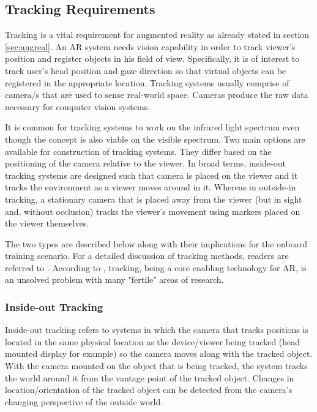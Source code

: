 \subsection{Tracking Requirements}
Tracking is a vital requirement for augmented reality as already stated in section \ref{sec:augreal}. An AR system needs vision capability in order to track viewer’s position and register objects in his field of view. Specifically, it is of interest to track user's head position and gaze direction so that virtual objects can be registered in the appropriate location. Tracking systems usually comprise of camera/s that are used to sense real-world space. Cameras produce the raw data necessary for computer vision systems.   

It is common for tracking systems to work on the infrared light spectrum even though the concept is also viable on the visible spectrum. Two main options are available for construction of tracking systems. They differ based on the positioning of the camera relative to the viewer. In broad terms, inside-out tracking systems are designed such that camera is placed on the viewer and it tracks the environment as a viewer moves around in it. Whereas in outside-in tracking, a stationary camera that is placed away from the viewer (but in sight and, without occlusion) tracks the viewer’s movement using markers placed on the viewer themselves. 

The two types are described below along with their implications for the onboard training scenario. For a detailed discussion of tracking methods, readers are referred to \cite{zhou2008trends}. According to \cite{zhou2008trends}, tracking, being a core enabling technology for AR, is an unsolved problem with many "fertile" areas of research.

\subsubsection{Inside-out Tracking}
Inside-out tracking refers to systems in which the camera that tracks positions is located in the same physical location as the device/viewer being tracked (head mounted display for example) so the camera moves along with the tracked object. With the camera mounted on the object that is being tracked, the system tracks the world around it from the vantage point of the tracked object. Changes in location/orientation of the tracked object can be detected from the camera’s changing perspective of the outside world.

